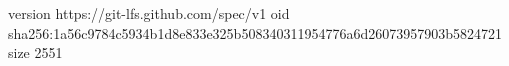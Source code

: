 version https://git-lfs.github.com/spec/v1
oid sha256:1a56c9784c5934b1d8e833e325b508340311954776a6d26073957903b5824721
size 2551
